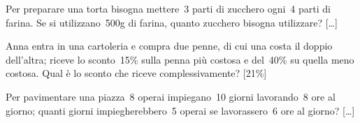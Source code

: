 \begin{htmulticols}{2}
\begin{esercizio}
\label{ese:3.197}
Per preparare una torta bisogna mettere~3 parti di zucchero ogni~4
parti di farina. Se si utilizzano~500g di farina, quanto zucchero
bisogna utilizzare? \hfill [\dots]
\end{esercizio}



\begin{esercizio}
\label{ese:3.201}
 Anna entra in una cartoleria e compra due penne, di cui una costa il
doppio dell'altra; riceve lo sconto~15\% sulla penna
più costosa e del~40\% su quella meno costosa. Qual è lo sconto che
riceve complessivamente? \hfill [21\%]
\end{esercizio}

% 
% 

\begin{esercizio}
\label{ese:3.205}
Per pavimentare una piazza~8 operai impiegano~10 giorni
lavorando~8 ore al giorno; quanti giorni impiegherebbero~5 operai se
lavorassero~6 ore al giorno? \hfill [\dots]
\end{esercizio}


\end{htmulticols}
